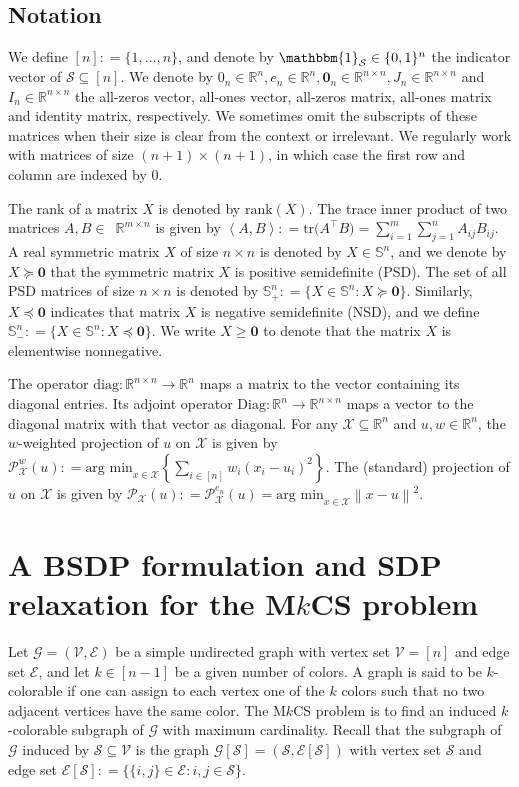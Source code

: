\documentclass[11pt, a4paper]{article}
\newcommand{\tr}[1]{{\text{tr} #1}}
\newcommand{\rank}[1]{{\text{rank}\left(#1\right)}}
\newcommand{\IP}[2]{\left\langle #1, #2 \right\rangle}
\newcommand{\eqdef}{\mathrel{\mathop:}=}
\newcommand{\psd}{\succeq}
\newcommand{\argmin}{\text{arg min}}
\newcommand{\nsd}{\preceq}
\newcommand\norm[1]{\left\lVert#1\right\rVert}
\newcommand{\mc}{\mathcal}
\begin{document}
\subsection{Notation} \label{Sec: notation}
We define $[n] \eqdef \{1,\hdots,n\}$, and denote by $\mathbbm{1}_\mc{S} \in \{0,1\}^n$ the indicator vector of $\mc{S} \subseteq [n]$.
We denote by $0_n\in\mathbb{R}^n, e_n\in\mathbb{R}^n, \mathbf{0}_n \in\mathbb{R}^{n\times n}, J_n \in\mathbb{R}^{n\times n}$ and $I_n \in\mathbb{R}^{n\times n}$ the all-zeros vector, all-ones vector, all-zeros matrix, all-ones matrix and identity matrix, respectively.
We sometimes omit the subscripts of these matrices when their size is clear from the context or irrelevant. 
We regularly work with matrices of size $(n+1)\times(n+1)$, in which case the first row and column are indexed by $0$.

The rank of a matrix $X$ is denoted by $\rank{X}$.
The trace inner product of two matrices $A, B \in$~$\mathbb{R}^{m\times n}$ is given by $\IP{A}{B} \eqdef \tr(A^\top B) = \sum_{i=1}^m \sum_{j=1}^n A_{ij} B_{ij}$.
A real symmetric matrix $X$ of size $n\times n$ is denoted by $X \in \mathbb{S}^n$, and we denote by $X \psd \textbf{0}$ that the symmetric matrix $X$ is positive semidefinite (PSD). 
The set of all PSD matrices of size $n\times n$ is denoted by $\mathbb{S}^n_+ \eqdef \{X\in \mathbb{S}^n: X \psd \textbf{0}\}$. 
Similarly, $X \nsd \textbf{0}$ indicates that matrix $X$ is negative semidefinite (NSD), and we define $\mathbb{S}^n_- \eqdef \{X\in \mathbb{S}^n: X \nsd \textbf{0}\}$. 
We write $X\geq \textbf{0}$ to denote that the matrix $X$ is elementwise nonnegative.

The operator $\text{diag}: \mathbb{R}^{n\times n} \to \mathbb{R}^n$ maps a matrix to the vector containing its diagonal entries.
Its adjoint operator $\text{Diag}: \mathbb{R}^{n} \to \mathbb{R}^{n\times n}$ maps a vector to the diagonal matrix with that vector as diagonal. 
For any $\mc{X} \subseteq \mathbb{R}^n$ and $u, w \in \mathbb{R}^n$, the $w$-weighted projection of $u$ on $\mc{X}$ is given by $\mc{P}_\mc{X}^w(u) \eqdef \argmin_{x \in \mc{X}} \left\{\sum_{i \in [n]} w_{i}(x_{i}-u_{i})^2\right\}$.
The (standard) projection of $u$ on $\mc{X}$ is given by $\mc{P}_\mc{X}(u) \eqdef \mc{P}_\mc{X}^{e_n}(u) = \argmin_{x \in \mc{X}} \norm{x-u}^2$.

\section{A BSDP formulation and SDP relaxation for the M$k$CS problem} \label{Sec: BSDP formulation}
Let $\mc{G} = (\mc{V},\mc{E})$ be a simple undirected graph with vertex set $\mc{V} = [n]$ and edge set $\mc{E}$, and let $k \in [n-1]$ be a given number of colors. 
A graph is said to be $k$-colorable if one can assign to each vertex one of the $k$ colors such that no two adjacent vertices have the same color. The M$k$CS problem is to find an induced $k$-colorable subgraph of $\mc{G}$ with maximum cardinality.
Recall that the subgraph of $\mc{G}$ induced by $\mc{S} \subseteq \mc{V}$ is the graph $\mc{G}[\mc{S}] = (\mc{S}, \mc{E}[\mc{S}])$ with vertex set $\mc{S}$ and edge set $\mc{E}[\mc{S}] \eqdef \{\{i,j\} \in \mc{E}: i,j \in \mc{S}\}$.
\end{document}

